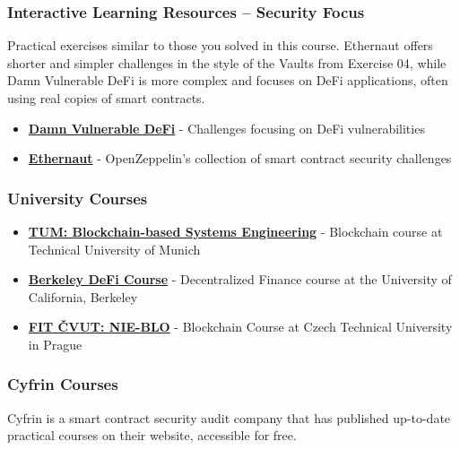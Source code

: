 \documentclass[12pt]{article}
\begin{document}
\subsubsection*{Interactive Learning Resources -- Security Focus}

Practical exercises similar to those you solved in this course. Ethernaut
offers shorter and simpler challenges in the style of the Vaults from Exercise
04, while Damn Vulnerable DeFi is more complex and focuses on DeFi
applications, often using real copies of smart contracts.

\begin{itemize}
    \item \textbf{\href{https://www.damnvulnerabledefi.xyz/}{Damn Vulnerable DeFi}} - Challenges focusing on DeFi vulnerabilities
    \item \textbf{\href{https://ethernaut.openzeppelin.com/}{Ethernaut}} - OpenZeppelin's collection of smart contract security challenges
\end{itemize}

\subsubsection*{University Courses}

\begin{itemize}
    \item \textbf{\href{https://github.com/sebischair/bbse}{TUM: Blockchain-based Systems Engineering}} - Blockchain course at Technical University of Munich
    \item \textbf{\href{https://rdi.berkeley.edu/berkeley-defi/f24}{Berkeley DeFi Course}} - Decentralized Finance course at the University of California, Berkeley
    \item \textbf{\href{https://courses.fit.cvut.cz/NIE-BLO/index.html}{FIT ČVUT: NIE-BLO}} - Blockchain Course at Czech Technical University in Prague
\end{itemize}

\subsubsection*{Cyfrin Courses}

Cyfrin is a smart contract security audit company that has published up-to-date
practical courses on their website, accessible for free.
\end{document}
